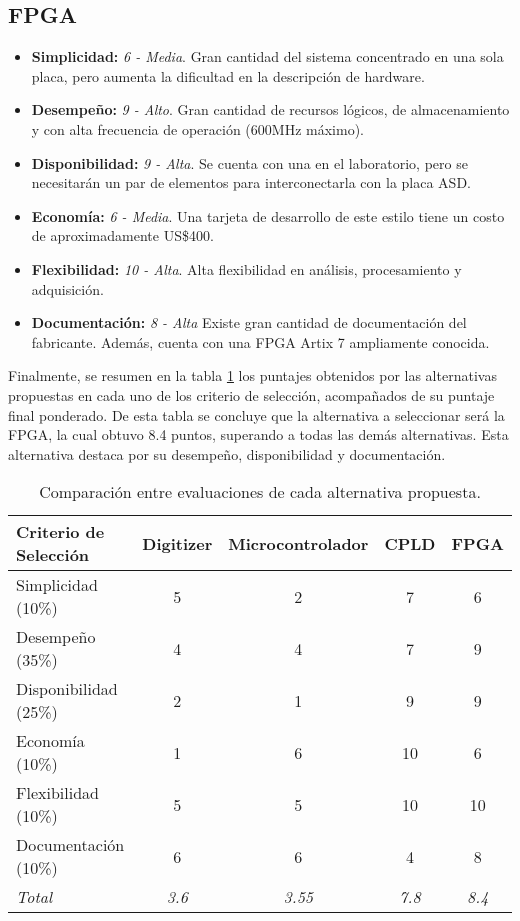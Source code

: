 \subsection{FPGA}
\begin{itemize}
    \item \textbf{Simplicidad:}  \textit{6 - Media}. Gran cantidad del sistema concentrado en una sola placa, pero aumenta la dificultad en la descripción de hardware.
    \item \textbf{Desempeño:}  \textit{9 - Alto}. Gran cantidad de recursos lógicos, de almacenamiento y con alta  frecuencia de operación (600MHz máximo).
    \item \textbf{Disponibilidad: } \textit{9 - Alta}. Se cuenta con una en el laboratorio, pero se necesitarán un par de elementos para interconectarla con la placa ASD.
    \item \textbf{Economía: }\textit{6 - Media}. Una tarjeta de desarrollo de este estilo tiene un costo de aproximadamente US\$400.
    \item \textbf{Flexibilidad:} \textit{10 - Alta}. Alta flexibilidad en análisis, procesamiento y adquisición.
    \item \textbf{Documentación:} \textit{8 - Alta} Existe gran cantidad de documentación del fabricante. Además, cuenta con una FPGA Artix 7 ampliamente conocida.
\end{itemize}

\par Finalmente, se resumen en la tabla \ref{tab:comparacion} los puntajes obtenidos por las alternativas propuestas en cada uno de los criterio de selección, acompañados de su puntaje final ponderado. De esta tabla se concluye que la alternativa a seleccionar será la FPGA, la cual obtuvo 8.4 puntos, superando a todas las demás alternativas. Esta alternativa destaca por su desempeño, disponibilidad y documentación.

\begin{table}[H]
\centering
\begin{tabular}{|l|c|c|c|c|}
\hline
\textbf{Criterio de Selección} & \textbf{Digitizer} & \textbf{Microcontrolador} & \textbf{CPLD} & \textbf{FPGA} \\ \hline
Simplicidad (10\%) & 5 & 2 & 7 & 6 \\ \hline
Desempeño (35\%) & 4 & 4 & 7 & 9 \\ \hline
Disponibilidad (25\%) & 2 & 1 & 9 & 9 \\ \hline
Economía (10\%) & 1 & 6 & 10 & 6 \\ \hline
Flexibilidad (10\%) & 5 & 5 & 10 & 10 \\ \hline
Documentación (10\%) & 6 & 6 & 4 & 8 \\ \hline
\textit{Total} & \textit{3.6} & \textit{3.55} & \textit{7.8} & \textit{8.4} \\ \hline
\end{tabular}
\caption{Comparación entre evaluaciones de cada alternativa propuesta.}
\label{tab:comparacion}
\end{table}


